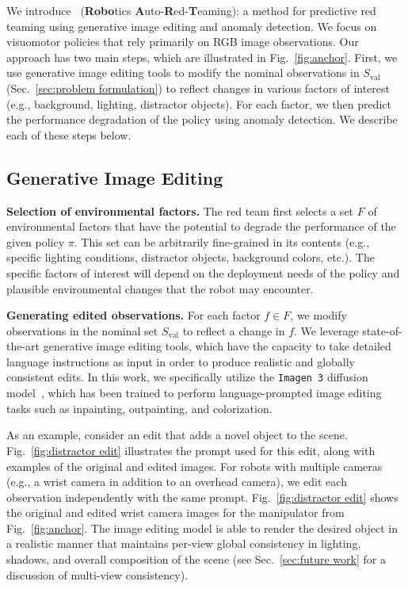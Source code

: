 We introduce \redit~({\bf Robo}tics {\bf A}uto-{\bf R}ed-{\bf T}eaming): a method for predictive red teaming using generative image editing and anomaly detection. We focus on visuomotor policies that rely primarily on RGB image observations. Our approach has two main steps, which are illustrated in Fig.~\ref{fig:anchor}. First, we use generative image editing tools to modify the nominal observations in $S_\text{val}$ (Sec.~\ref{sec:problem formulation}) to reflect changes in various factors of interest (e.g., background, lighting, distractor objects). For each factor, we then predict the performance degradation of the policy using anomaly detection. We describe each of these steps below. 

\subsection{Generative Image Editing}
\label{sec:image editing}

{\bf Selection of environmental factors.} The red team first selects a set $F$ of environmental factors that have the potential to degrade the performance of the given policy $\pi$. This set can be arbitrarily fine-grained in its contents (e.g., specific lighting conditions, distractor objects, background colors, etc.). The specific factors of interest will depend on the deployment needs of the policy and plausible environmental changes that the robot may encounter. 

{\bf Generating edited observations.} For each factor $f \in F$, we modify observations in the nominal set $S_\text{val}$ to reflect a change in $f$. We leverage state-of-the-art generative image editing tools, which have the capacity to take detailed language instructions as input in order to produce realistic and globally consistent edits. In this work, we specifically utilize the \texttt{Imagen~3} diffusion model~\cite{baldridge2024imagen}, which has been trained to perform language-prompted image editing tasks such as inpainting, outpainting, and colorization. 

As an example, consider an edit that adds a novel object to the scene. Fig.~\ref{fig:distractor edit} illustrates the prompt used for this edit, along with examples of the original and edited images. For robots with multiple cameras (e.g., a wrist camera in addition to an overhead camera), we edit each observation independently with the same prompt. Fig.~\ref{fig:distractor edit} shows the original and edited wrist camera images for the manipulator from Fig.~\ref{fig:anchor}. The image editing model is able to render the desired object in a realistic manner that maintains per-view global consistency in lighting, shadows, and overall composition of the scene (see Sec.~\ref{sec:future work} for a discussion of multi-view consistency). 

